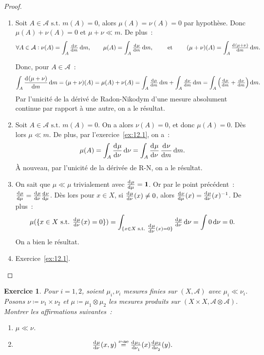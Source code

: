 \documentclass{article}
\newtheorem{ex}{Exercice}[section]
\newcommand{\st}{\text{ s.t. }}
\begin{document}
\begin{proof}
\begin{enumerate}
	\item Soit $A \in \mathcal A \st m(A) = 0$, alors $\mu(A) = \nu(A) = 0$ par hypothèse. Donc $\mu(A)+\nu(A) = 0$ et $\mu+\nu \ll m$. De plus~:
	\[\forall A \in \mathcal A : \nu(A) = \int_A \od \nu m\dif m, \qquad \mu(A) = \int_A \od \mu m\dif m, \qquad \text{ et } \qquad (\mu+\nu)(A) = \int_A\od {(\mu+\nu)}m\dif m.\]

	Donc, pour $A \in \mathcal A$~:
	\[\int_A\dod {(\mu+\nu)}m\dif m = (\mu+\nu)(A) = \mu(A) + \nu(A) = \int_A\od \mu m\dif m + \int_A\od \nu m\dif m = \int_A \left(\od \mu m + \od \nu m\right)\dif m.\]
	Par l'unicité de la dérivé de Radon-Nikodym d'une mesure absolument continue par rapport à une autre, on a le résultat.

	\item Soit $A \in \mathcal A \st m(A) = 0$. On a alors $\nu(A) = 0$, et donc $\mu(A) = 0$. Dès lors $\mu \ll m$. De plus, par l'exercice~\ref{ex:12.1}, on a~:
	\[\mu(A) = \int_A\dod \mu\nu\dif\nu = \int_A\dod\mu\nu\dod\nu m\dif m.\]
	À nouveau, par l'unicité de la dérivée de R-N, on a le résultat.

	\item On sait que $\mu \ll \mu$ trivialement avec $\od \mu\mu = \mathbf 1$. Or par le point précédent~: $\od \mu\mu = \od \mu\nu\od\nu\mu$. Dès lors pour $x \in X$, si
	$\od \mu\nu(x) \neq 0$, alors $\od \nu\mu(x) = \od \mu\nu(x)^{-1}$. De plus~:
	\[\mu(\{x \in X \st \od \mu\nu(x) = 0\}) = \int_{\{x \in X \st \od \mu\nu(x) = 0\}}\od\mu\nu\dif\nu = \int0\dif\nu = 0.\]
	On a bien le résultat.

	\item Exercice~\ref{ex:12.1}.
\end{enumerate}
\end{proof}

\begin{ex} Pour $i=1, 2$, soient $\mu_i, \nu_i$ mesures finies sur $(X, \mathcal A)$ avec $\mu_i \ll \nu_i$. Posons $\nu \coloneqq \nu_1 \times \nu_2$ et
$\mu \coloneqq \mu_1 \otimes \mu_2$ les mesures produits sur $(X \times X, \mathcal A \otimes \mathcal A)$. Montrer les affirmations suivantes~:
\begin{enumerate}
	\item $\mu \ll \nu$.
	\item
	\[\od \mu\nu(x, y) \stackrel {\nu\text{-ae}}= \od {\mu_1}{\nu_1}(x)\od {\mu_2}{\nu_2}(y).\]
\end{enumerate}
\end{ex}
\end{document}
